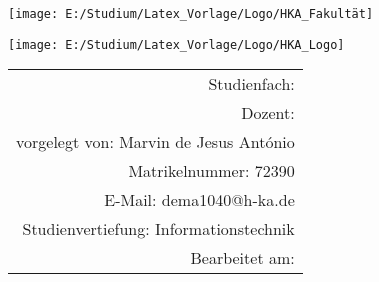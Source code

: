 	\sffamily %
	\parbox[t]{0.35\textwidth}
	{\vspace{0pt}\texttt{[image: E:/Studium/Latex\_Vorlage/Logo/HKA\_Fakultät]}}
	\hfill
	\parbox[t]{0.15\textwidth}
	{\vspace{0pt}\texttt{[image: E:/Studium/Latex\_Vorlage/Logo/HKA\_Logo]}}
	\vfill
	\parbox{\textwidth}
	{}
	\vfill
	\parbox{\textwidth}
	{\begin{flushright}{\large
			\begin{tabular}{r}
				Studienfach:  \\
				Dozent:  \\
				vorgelegt von: Marvin de Jesus António \\
				Matrikelnummer: 72390 \\
				E-Mail: dema1040@h-ka.de \\
				Studienvertiefung: Informationstechnik \\
				Bearbeitet am: 
			\end{tabular}}
	\end{flushright}}
	\rmfamily %
	\normalsize %